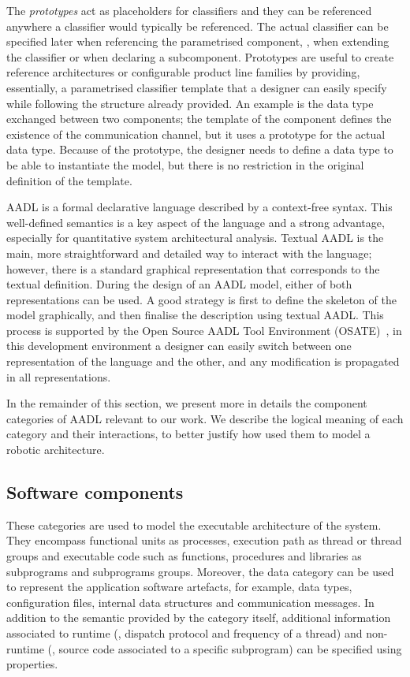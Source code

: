 The \textit{prototypes} act as placeholders for classifiers and they can be referenced anywhere a classifier would typically be referenced. The actual classifier can be specified later when referencing the parametrised component, \eg, when extending the classifier or when declaring a subcomponent. Prototypes are useful to create reference architectures or configurable product line families by providing, essentially, a parametrised classifier template that a designer can easily specify while following the structure already provided. An example is the data type exchanged between two components; the template of the component defines the existence of the communication channel, but it uses a prototype for the actual data type. Because of the prototype, the designer needs to define a data type to be able to instantiate the model, but there is no restriction in the original definition of the template.

AADL is a formal declarative language described by a context-free syntax. This well-defined semantics is a key aspect of the language and a strong advantage, especially for quantitative system architectural analysis. Textual AADL is the main, more straightforward and detailed way to interact with the language; however, there is a standard graphical representation that corresponds to the textual definition. During the design of an AADL model, either of both representations can be used. A good strategy is first to define the skeleton of the model graphically, and then finalise the description using textual AADL. This process is supported by the Open Source AADL Tool Environment (OSATE)~\cite{feiler2004open}, in this development environment a designer can easily switch between one representation of the language and the other, and any modification is propagated in all representations.

In the remainder of this section, we present more in details the component categories of AADL relevant to our work. We describe the logical meaning of each category and their interactions, to better justify how used them to model a robotic architecture.

\subsection{Software components}
These categories are used to model the executable architecture of the system. They encompass functional units as processes, execution path as thread or thread groups and executable code such as functions, procedures and libraries as subprograms and subprograms groups. Moreover, the data category can be used to represent the application software artefacts, for example, data types, configuration files, internal data structures and communication messages. In addition to the semantic provided by the category itself, additional information associated to runtime (\eg, dispatch protocol and frequency of a thread) and non-runtime (\eg, source code associated to a specific subprogram) can be specified using properties.

